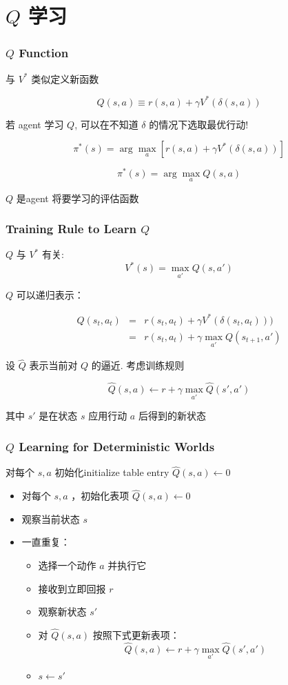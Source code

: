 \documentclass{beamer}
\begin{document}
\section{$Q$ 学习}
\label{sec-3}
\begin{frame}
\frametitle{$Q$ Function}
\label{sec-3-1}


与 $V^*$ 类似定义新函数

\[ Q(s,a) \equiv r(s,a) + \gamma V^{*}(\delta(s,a)) \]

若 agent 学习 $Q$, 可以在不知道 $\delta$ 的情况下选取最优行动!

$$\pi^{*}(s) = \arg\max_{a} [r(s,a) + \gamma V^{*}(\delta(s,a))]$$

\[ \pi^{*}(s) = \arg\max_{a} Q(s,a) \]

$Q$ 是agent 将要学习的评估函数
\end{frame}
\begin{frame}
\frametitle{Training Rule to Learn $Q$}
\label{sec-3-2}


 $Q$ 与 $V^*$ 有关:
\[  V^{*}(s) = \max_{a'}Q(s,a') \]

 $Q$ 可以递归表示：

\begin{eqnarray}
Q(s_t,a_t) &= &  r(s_t,a_t) + \gamma V^{*}(\delta(s_t,a_t))) \nonumber \\
 &= &  r(s_t,a_t) + \gamma \max_{a'}Q(s_{t+1},a') \nonumber
\end{eqnarray}

设 $\hat{Q}$ 表示当前对 $Q$ 的逼近.  考虑训练规则

\[ \hat{Q}(s,a) \leftarrow r + \gamma \max_{a'}\hat{Q}(s',a') \]

其中 $s'$ 是在状态 $s$ 应用行动 $a$ 后得到的新状态
\end{frame}
\begin{frame}
\frametitle{$Q$ Learning for Deterministic Worlds}
\label{sec-3-3}


对每个 $s, a$ 初始化initialize table entry $\hat{Q}(s,a) \leftarrow 0$

\begin{itemize}
\item 对每个 $s,a$ ，初始化表项 $\hat{Q}(s,a) \leftarrow 0$
\item 观察当前状态 $s$
\item 一直重复：
\begin{itemize}
\item 选择一个动作 $a$ 并执行它
\item 接收到立即回报 $r$
\item 观察新状态 $s'$
\item 对 $\hat{Q}(s,a)$ 按照下式更新表项：
        \begin{displaymath}
        \hat{Q}(s,a) \leftarrow r + \gamma \max_{a'}\hat{Q}(s',a') 
        \end{displaymath}
\item $s \leftarrow s'$
\end{itemize}
\end{itemize}
\end{frame}
\end{document}
